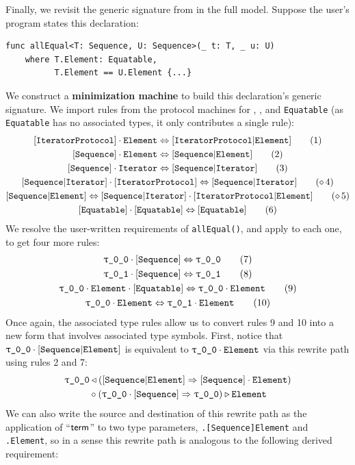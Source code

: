 \documentclass[../generics]{subfiles}
\begin{document}
\begin{example}
Finally, we revisit the generic signature from  in the full model. Suppose the user's program states this declaration:
\begin{Verbatim}
func allEqual<T: Sequence, U: Sequence>(_ t: T, _ u: U)
    where T.Element: Equatable,
          T.Element == U.Element {...}
\end{Verbatim}
We construct a \textbf{minimization machine} to build this declaration's generic signature. We import rules from the protocol machines for \tIterator, \tSequence, and \texttt{Equatable} (as \texttt{Equatable} has no associated types, it only contributes a single rule):
\begin{gather*}
\AssocRule{IteratorProtocol}{Element} \tag{1}\\
\AssocRule{Sequence}{Element}\tag{2}\\
\AssocRule{Sequence}{Iterator}\tag{3}\\
\ConfRule{\assocsym{Sequence}{Iterator}}{\pIterator} \tag{$\CRule{4}$} \\
\SameRule{\assocsym{Sequence}{Element}}{\assocsym{Sequence}{Iterator}\cdot\assocsym{IteratorProtocol}{Element}} \tag{$\CRule{5}$}\\
\ConfRule{\protosym{Equatable}}{\protosym{Equatable}}\tag{6}
\end{gather*}
We resolve the user-written requirements of \texttt{allEqual()}, and apply  to each one, to get four more rules:
\begin{gather*}
\ConfRule{\rT}{\pSequence}\tag{7}\\
\ConfRule{\rU}{\pSequence}\tag{8}\\
\ConfRule{\rT\cdot\nElement}{\protosym{Equatable}}\tag{9}\\
\SameRule{\rT\cdot\nElement}{\rU\cdot\nElement}\tag{10}
\end{gather*}
Once again, the associated type rules allow us to convert rules 9 and 10 into a new form that involves associated type symbols. First, notice that $\rT\cdot\assocsym{Sequence}{Element}$ is equivalent to $\rT\cdot\nElement$ via this rewrite path using rules 2 and 7:
\begin{gather*}
\rT \WL (\assocsym{Sequence}{Element} \Red \pSequence\cdot\nElement)\\
{} \circ (\rT\cdot\pSequence \Red \rT) \WR \nElement
\end{gather*}
We can also write the source and destination of this rewrite path as the application of ``$\mathsf{term}$'' to two type parameters, \texttt{\rT.[Sequence]Element} and \texttt{\rT.Element}, so in a sense this rewrite path is analogous to the following derived requirement:

\end{example}
\end{document}
